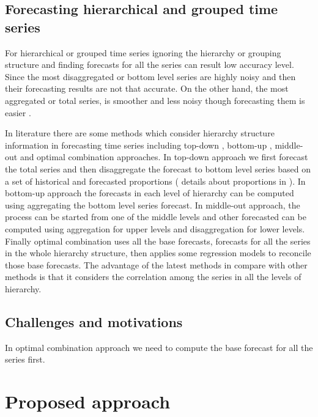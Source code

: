 \documentclass[11pt,a4paper,]{article}
\theoremstyle{definition}
\theoremstyle{definition}
\theoremstyle{definition}
\theoremstyle{remark}
\begin{document}
\subsection{Forecasting hierarchical and grouped time
series}\label{forecasting-hierarchical-and-grouped-time-series}

For hierarchical or grouped time series ignoring the hierarchy or
grouping structure and finding forecasts for all the series can result
low accuracy level. Since the most disaggregated or bottom level series
are highly noisy and then their forecasting results are not that
accurate. On the other hand, the most aggregated or total series, is
smoother and less noisy though forecasting them is easier
\autocite{fliedner2001hierarchical}.

In literature there are some methods which consider hierarchy structure
information in forecasting time series including top-down
\autocite{gross1990disaggregation}, bottom-up
\autocite{kahn1998revisiting}, middle-out and optimal combination
\autocite{hyndman2011optima} approaches. In top-down approach we first
forecast the total series and then disaggregate the forecast to bottom
level series based on a set of historical and forecasted proportions (
details about proportions in \textcite{athanasopoulos2009hierarchical}).
In bottom-up approach the forecasts in each level of hierarchy can be
computed using aggregating the bottom level series forecast. In
middle-out approach, the process can be started from one of the middle
levels and other forecasted can be computed using aggregation for upper
levels and disaggregation for lower levels. Finally optimal combination
uses all the base forecasts, forecasts for all the series in the whole
hierarchy structure, then applies some regression models to reconcile
those base forecasts. The advantage of the latest methods in compare
with other methods is that it considers the correlation among the series
in all the levels of hierarchy.

\subsection{Challenges and
motivations}\label{challenges-and-motivations}

In optimal combination approach we need to compute the base forecast for
all the series first.

\section{Proposed approach}\label{proposed-approach}
\end{document}
